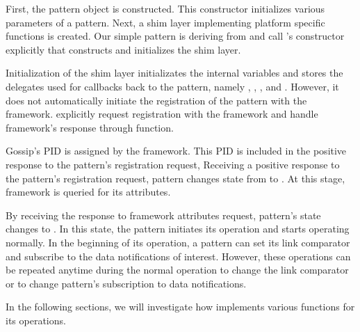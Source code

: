 First, the pattern object is constructed. This constructor initializes various parameters of a pattern. 
Next, a shim layer implementing platform specific functions is created. 
Our simple pattern is deriving from  and call 's constructor explicitly that
constructs and initializes the shim layer. 



Initialization of the shim layer 
initializates the internal variables and stores the delegates used for callbacks back to the pattern, namely
, ,
, and
.
However, it does not automatically initiate the registration of the pattern with the framework.  explicitly request registration with the framework and handle framework's response through  function. 

Gossip's PID is assigned by the framework. This PID is included in the positive response to the pattern's registration request,
Receiving a positive response to the pattern's registration request, pattern changes state from  to . 
At this stage, framework is queried for its attributes. 

By receiving the response to framework attributes request, pattern's state changes to . 
In this state, the pattern initiates its operation and starts operating normally. 
In the beginning of its operation, a pattern can set its link comparator and subscribe to the data notifications of interest. 
However, these operations can be repeated anytime during the normal operation to change the link comparator or to change pattern's subscription to data notifications.  

In the following sections, we will investigate how  implements various functions for its operations.  



